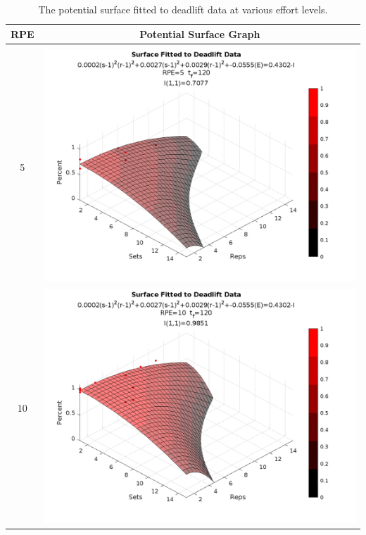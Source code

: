 \begin{table}[]
    \centering
    \begin{tabular}{c|c}
        RPE & Potential Surface Graph \\
        \hline \\
        
        5 &
        \includegraphics[width=139mm]{DeadliftSurface/5.png} \\
        10 &
        \includegraphics[width=139mm]{DeadliftSurface/10.png} \\
    \end{tabular}
    \caption{The potential surface fitted to deadlift data at various effort levels.}
    \label{tab:DeadliftPotentialSurfaceAcrossEffort}
\end{table}

